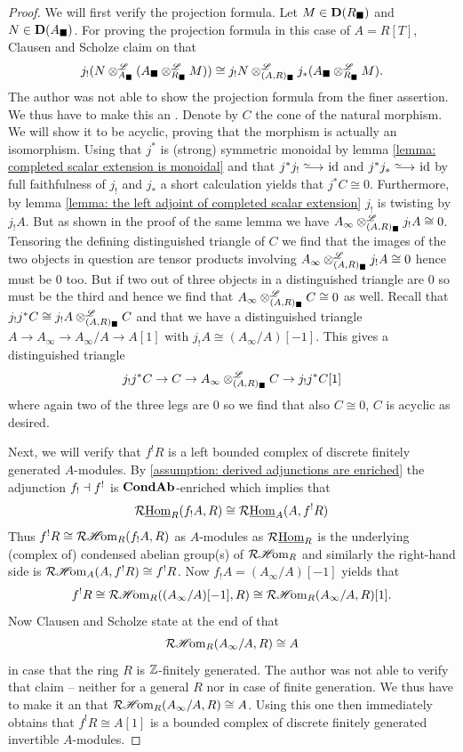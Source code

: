 \begin{proof}
	We will first verify the projection formula. Let $M\in {{\mathbf{D}}(R_\blacksquare)}$ and $N\in{{\mathbf{D}}(A_\blacksquare)}$. For proving the projection formula in this case of $A=R[T]$, Clausen and Scholze claim on \cite[p.57]{condenseddotpdf} that 
	$$j_!(N\otimes^{\mathscr{L}}_{A_\blacksquare} (A_\blacksquare\otimes^{\mathscr{L}}_{R_\blacksquare} M)) \cong j_!N\otimes^{\mathscr{L}}_{(A, R)_\blacksquare} j_\ast(A_\blacksquare \otimes^{\mathscr{L}}_{R_\blacksquare} M).$$
	The author was not able to show the projection formula from the finer assertion. We thus have to make this an \assumptionPreWord. Denote by $C$ the cone of the natural morphism. We will show it to be acyclic, proving that the morphism is actually an isomorphism. Using that $j^\ast$ is (strong) symmetric monoidal by lemma \ref{lemma: completed scalar extension is monoidal} and that $j^\ast j_! \isorightarrow \id$ and $j^\ast j_\ast\isorightarrow \id$ by full faithfulness of $j_!$ and $j_\ast$ a short calculation yields that $j^\ast C \cong 0$. Furthermore, by lemma \ref{lemma: the left adjoint of completed scalar extension} $j_!$ is twisting by $j_! A$. But as shown in the proof of the same lemma we have $A_\infty\otimes^{\mathscr{L}}_{(A, R)_\blacksquare} j_! A \cong 0$. Tensoring the defining distinguished triangle of $C$ we find that the images of the two objects in question are tensor products involving $A_\infty\otimes^{\mathscr{L}}_{(A, R)_\blacksquare} j_! A \cong 0$ hence must be $0$ too. But if two out of three objects in a distinguished triangle are $0$ so must be the third and hence we find that $A_\infty\otimes^{\mathscr{L}}_{(A, R)_\blacksquare} C \cong 0$ as well. Recall that $j_! j^\ast C \cong j_!A\otimes^{\mathscr{L}}_{(A, R)_\blacksquare} C$ and that we have a distinguished triangle $A\to A_\infty \to A_\infty/A \to A[1]$ with $j_!A \cong (A_\infty/A)[-1]$. This gives a distinguished triangle
	$$j_! j^\ast C \to C\to A_\infty \otimes^{\mathscr{L}}_{(A, R)_\blacksquare} C \to j_!j^\ast C[1]$$
	where again two of the three legs are $0$ so we find that also $C\cong 0$, \ie $C$ is acyclic as desired.
	
	Next, we will verify that $f^!R$ is a left bounded complex of discrete finitely generated $A$-modules. By \assumptionPreWord \ref{assumption: derived adjunctions are enriched} the adjunction $f_!\dashv f^!$ is ${{{\mathbf{Cond}}}{{\mathbf{Ab}}}}$-enriched which implies that
		$$\mathcal{R}{\underline{\operatorname{Hom}}}_R(f_!A, R)\cong \mathcal{R}{\underline{\operatorname{Hom}}}_A(A, f^!R)$$
	Thus $f^!R \cong \mathcal{R}{\operatorname{\mathscr{H}\!om}}_R(f_!A, R)$ as $A$-modules as $\mathcal{R}{\underline{\operatorname{Hom}}}_R$ is the underlying (complex of) condensed abelian group(s) of $\mathcal{R}{\operatorname{\mathscr{H}\!om}}_R$ and similarly the right-hand side is $\mathcal{R}{\operatorname{\mathscr{H}\!om}}_A(A, f^!R) \cong f^!R$. Now $f_!A = (A_\infty/A)[-1]$ yields that
		$$f^!R \cong \mathcal{R}{\operatorname{\mathscr{H}\!om}}_R((A_\infty/A)[-1], R) \cong \mathcal{R}{\operatorname{\mathscr{H}\!om}}_R(A_\infty/A, R)[1].$$
	Now Clausen and Scholze state at the end of \cite[p. 57]{condenseddotpdf} that
		$$\mathcal{R}{\operatorname{\mathscr{H}\!om}}_R(A_\infty/A, R)\cong A$$
	in case that the ring $R$ is ${\mathbb{Z}}$-finitely generated. The author was not able to verify that claim -- neither for a general $R$ nor in case of finite generation. We thus have to make it an \assumptionPreWord that $\mathcal{R}{\operatorname{\mathscr{H}\!om}}_R(A_\infty/A, R)\cong A$. Using this one then immediately obtains that $f^!R \cong A[1]$ is a bounded complex of discrete finitely generated invertible $A$-modules.
		

\end{proof}
